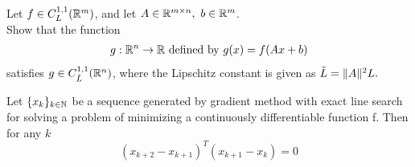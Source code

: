 \documentclass{ExerciseSheet}
\newif\ifsolutions
\begin{document}
\fi
\vskip 0.5cm
\begin{problem}

    Let $f \in C^{1,1}_L(\R^m)$, and let $A \in \mathbb{R}^{m\times n}, ~b\in \mathbb{R}^m$.\\
Show that the function 
 \begin{align*}
     g : \mathbb{R}^n \to \mathbb{R} \text{ defined by } g(x) = f(Ax+b)
 \end{align*}
 satisfies $g \in C^{1,1}_{\Tilde{L}}(\mathbb{R}^n)$, where the Lipschitz constant is given as $\Tilde{L} = \|A\|^2L.$

\end{problem}
\ifsolutions
\vskip 0.3cm
\begin{solution}
Let $x,y\in\Rn$ Let us prove that 
\begin{align*}
    \|\nabla g(x) - \nabla g(y) \| \leq \Tilde{L} \|x - y \|.
\end{align*}
It follows from the definition of $g$ that
\begin{align*}
    \|\nabla g(x) - \nabla g(y) \| &= \|A^T\nabla f(Ax+b) - A^T\nabla f(Ay+b) \| \\
    &\leq L \|A^T\| \|Ax+b -(Ay+b)\|\\
    &= L\|A^T\|\|A(x-y)\|\\
    &\leq L\|A\|^2\|x-y\|
\end{align*}
where we used the fact that $f \in C^{1,1}_L(\R^m)$ to get the first inequality and Cauchy-Schwarz to get the last inequality.
\end{solution}
\fi

\vskip 0.5cm

\begin{problem}
Let $\{x_k\}_{k\in \mathbb{N}}$ be a sequence generated by gradient method with exact line search for solving a problem of minimizing a continuously differentiable function f. Then for any $k$
\begin{equation*}
    \left(x_{k+2} - x_{k+1}\right)^T\left(x_{k+1}-x_k\right) = 0
\end{equation*}
\end{problem}
\end{document}
